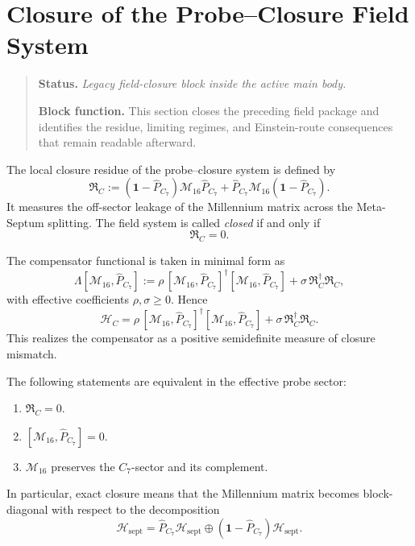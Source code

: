 \section{Closure of the Probe--Closure Field System}
\begin{quote}\small
\noindent\textbf{Status.} \emph{Legacy field-closure block inside the active main body.}\par
\noindent\textbf{Block function.} This section closes the preceding field package and identifies the residue, limiting regimes, and Einstein-route consequences that remain readable afterward.
\end{quote}
\label{sec:closure-field-system}

\begin{definition}
The local closure residue of the probe--closure system is defined by
\[
  \mathfrak R_C
  :=
  (\mathbf 1-\hat P_{C_7})\mathcal M_{16}\hat P_{C_7}
  + \hat P_{C_7}\mathcal M_{16}(\mathbf 1-\hat P_{C_7}).
\]
It measures the off-sector leakage of the Millennium matrix across the
Meta-Septum splitting.
The field system is called \emph{closed} if and only if
\[
  \mathfrak R_C = 0.
\]
\end{definition}

\begin{definition}
The compensator functional is taken in minimal form as
\[
  \Lambda[\mathcal M_{16},\hat P_{C_7}]
  :=
  \rho\,[\mathcal M_{16},\hat P_{C_7}]^
  \dagger [\mathcal M_{16},\hat P_{C_7}]
  + \sigma\,\mathfrak R_C^
  \dagger \mathfrak R_C,
\]
with effective coefficients $\rho,\sigma\ge 0$.
Hence
\[
  \mathcal H_C
  =
  \rho\,[\mathcal M_{16},\hat P_{C_7}]^
  \dagger [\mathcal M_{16},\hat P_{C_7}]
  + \sigma\,\mathfrak R_C^
  \dagger \mathfrak R_C.
\]
This realizes the compensator as a positive semidefinite measure of
closure mismatch.
\end{definition}

\begin{proposition}
\label{prop:equivalent-closure-criteria}
The following statements are equivalent in the effective probe sector:
\begin{enumerate}
  \item $\mathfrak R_C=0$.
  \item $[\mathcal M_{16},\hat P_{C_7}]=0$.
  \item $\mathcal M_{16}$ preserves the $C_7$-sector and its complement.
\end{enumerate}
In particular, exact closure means that the Millennium matrix becomes
block-diagonal with respect to the decomposition
\[
  \mathcal H_{\mathrm{sept}}
  = \hat P_{C_7}\mathcal H_{\mathrm{sept}}
  \oplus
  (\mathbf 1-\hat P_{C_7})\mathcal H_{\mathrm{sept}}.
\]
\end{proposition}

